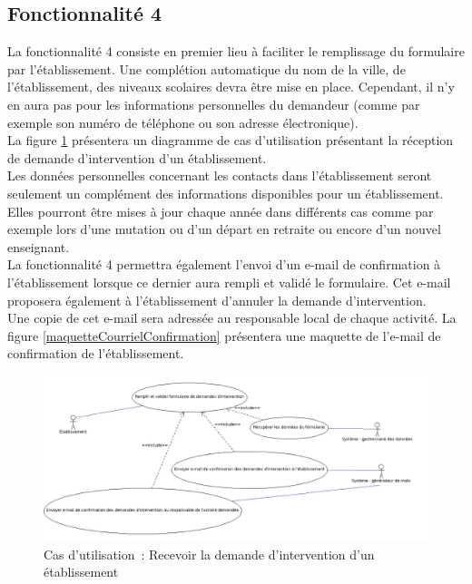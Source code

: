 \subsection{Fonctionnalité 4}
La fonctionnalité 4 consiste en premier lieu à faciliter le remplissage du formulaire par l'établissement. 
Une complétion automatique du nom de la ville, de l'établissement, des niveaux scolaires devra être mise en place. Cependant, il n'y en aura pas pour les informations personnelles du demandeur (comme  par exemple son numéro de téléphone ou son adresse électronique).\\
La figure \ref{recevoirDemandesDIntervention} présentera un diagramme de cas d'utilisation présentant la réception de demande d'intervention d'un établissement.\\
Les données personnelles concernant les contacts dans l'établissement seront seulement un complément des informations disponibles pour un établissement. Elles pourront être mises à jour chaque année dans différents cas comme par exemple lors d'une mutation ou d'un départ en retraite ou encore d'un nouvel enseignant.   \\

La fonctionnalité 4 permettra également l'envoi d'un e-mail de confirmation à l'établissement lorsque ce dernier aura rempli et validé le formulaire. Cet e-mail proposera également à l'établissement d'annuler la demande d'intervention. \\ Une copie de cet e-mail sera adressée au responsable local de chaque activité.
La figure \ref{maquetteCourrielConfirmation} présentera une maquette de l'e-mail de confirmation de l'établissement.\\
\begin{figure}[H]
	\centering
	\includegraphics[scale=0.4]{images/casDUtilisation/fonctionnalite4ReceptionIntervention.png}
	 \caption{Cas d'utilisation~: Recevoir la demande d'intervention d'un établissement}
	 \label{recevoirDemandesDIntervention}
\end{figure}

